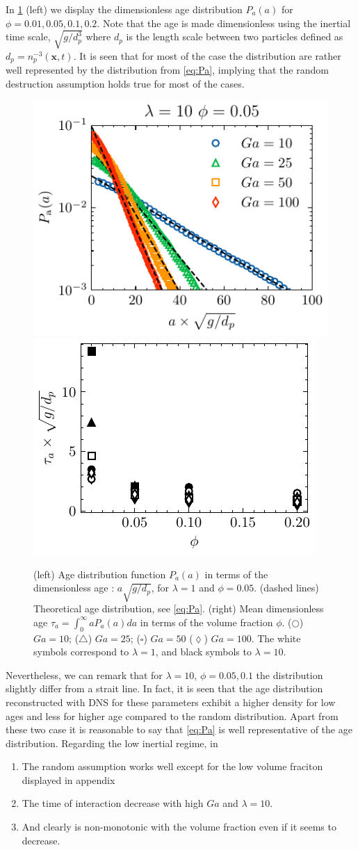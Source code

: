 In \ref{fig:age_picture} (left) we display the dimensionless age distribution $P_a(a)$ for $\phi = 0.01,0.05,0.1,0.2$. 
Note that the age is made dimensionless using the inertial time scale, $\sqrt{g/d_p^3}$ where $d_p$ is the length scale between two particles defined as $d_p = n_p^{-3}(\textbf{x},t)$. 
It is seen that for most of the case the distribution are rather well represented by the distribution from \ref{eq:Pa}, implying that the random destruction assumption holds true for most of the cases. 
\begin{figure}[h!]
    \centering

    \includegraphics[height = 0.3\textwidth]{image/HOMOGENEOUS_NEW/Dist/Pa_l_10_PHI_5.pdf}
    \includegraphics[height = 0.3\textwidth]{image/HOMOGENEOUS_NEW/tau_PHI.pdf}
    \caption{(left) Age distribution function $P_a(a)$ in terms of the dimensionless age : $a \sqrt{g/d_p}$, for $\lambda = 1$ and  $\phi = 0.05$.
    (dashed lines) Theoretical age distribution, see \ref{eq:Pa}. 
    (right) Mean dimensionless age $\tau_a =  \int_0^\infty aP_a(a)da$ in terms of the volume fraction $\phi$.  
    ($\bigcirc$) $Ga=10$; ($\triangle$) $ Ga = 25$; ($\square$) $Ga = 50$ ($\lozenge$) $Ga =100$.
    The white symbols correspond to $\lambda = 1$, and black symbols to $\lambda = 10$. }
    \label{fig:age_picture}
\end{figure}
Nevertheless, we can remark that for $\lambda = 10$, $\phi = 0.05,0.1$ the distribution slightly differ from a strait line. 
In fact, it is seen that the age distribution reconstructed with DNS for these parameters exhibit a higher density for low ages and less for higher age compared to the random distribution.
Apart from these two case it is reasonable to say that \ref{eq:Pa} is well representative of the age distribution. 
Regarding the low inertial regime, in 
\begin{enumerate}
    \item The random assumption works well except for the low volume fraciton displayed in appendix
    \item The time of interaction decrease with high $Ga$ and $\lambda = 10$.
    \item And clearly is non-monotonic with the volume fraction even if it seems to decrease. 
\end{enumerate}


